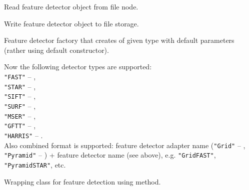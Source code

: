 Read feature detector object from file node.


\begin{description}
\end{description}

Write feature detector object to file storage.


\begin{description}
\end{description}

Feature detector factory that creates  of given type with 
default parameters (rather using default constructor).


\begin{description}
\end{description}

Now the following detector types are supported:\\
\texttt{"FAST"} -- ,\\
\texttt{"STAR"} -- ,\\
\texttt{"SIFT"} -- , \\
\texttt{"SURF"} -- , \\
\texttt{"MSER"} -- , \\
\texttt{"GFTT"} -- , \\
\texttt{"HARRIS"} -- . \\
Also combined format is supported: feature detector adapter name (\texttt{"Grid"} -- 
, \texttt{"Pyramid"} -- 
) + feature detector name (see above), 
e.g. \texttt{"GridFAST"}, \texttt{"PyramidSTAR"}, etc.

Wrapping class for feature detection using  method.

